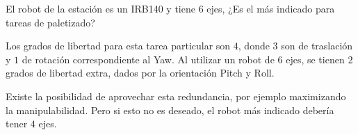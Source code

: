 \documentclass[a4paper,11pt]{article}
\begin{document}
\begin{center}
    \begin{tcolorbox}[colback=blue!10,colframe=blue!50!black]
        \centering
        El robot de la estación es un IRB140 y tiene $6$ ejes, ¿Es el más indicado para tareas de paletizado?
    \end{tcolorbox}
\end{center}

Los grados de libertad para esta tarea particular son $4$, donde $3$ son de traslación y $1$ de rotación correspondiente al Yaw. Al utilizar un robot de $6$ ejes, se tienen $2$ grados de libertad extra, dados por la orientación Pitch y Roll. 

Existe la posibilidad de aprovechar esta redundancia, por ejemplo maximizando la manipulabilidad. Pero si esto no es deseado, el robot más indicado debería tener $4$ ejes.   
\end{document}
